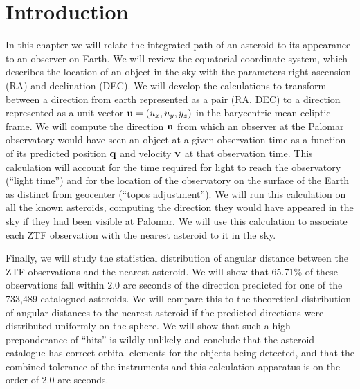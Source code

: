 \section{Introduction}
\label{section_intro}
In this chapter we will relate the integrated path of an asteroid to its appearance to an observer on Earth.
We will review the equatorial coordinate system, which describes the location of an object in the sky 
with the parameters right ascension (RA) and declination (DEC).
We will develop the calculations to transform between a direction from earth represented as a pair (RA, DEC)
to a direction represented as a unit vector $\mathbf{u} = (u_x, u_y, y_z)$ in the barycentric mean ecliptic frame.
We will compute the direction $\mathbf{u}$ from which an observer at the Palomar observatory would have seen 
an object at a given observation time as a function of its predicted position $\mathbf{q}$ and velocity $\mathbf{v}$ at that observation time.
This calculation will account for the time required for light to reach the observatory (``light time'')
and for the location of the observatory on the surface of the Earth as distinct from geocenter (``topos adjustment'').
We will run this calculation on all the known asteroids, computing the direction they would have appeared in the sky if they had been visible at Palomar.
We will use this calculation to associate each ZTF observation with the nearest asteroid to it in the sky.

Finally, we will study the statistical distribution of angular distance between the ZTF observations and the nearest asteroid.
We will show that 65.71\% of these observations fall within 2.0 arc seconds of the direction predicted for one of the 733,489 catalogued asteroids.
We will compare this to the theoretical distribution of angular distances to the nearest asteroid 
if the predicted directions were distributed uniformly on the sphere.
We will show that such a high preponderance of ``hits'' is wildly unlikely and conclude that the asteroid catalogue 
has correct orbital elements for the objects being detected, 
and that the combined tolerance of the instruments and this calculation apparatus is on the order of 2.0 arc seconds.


